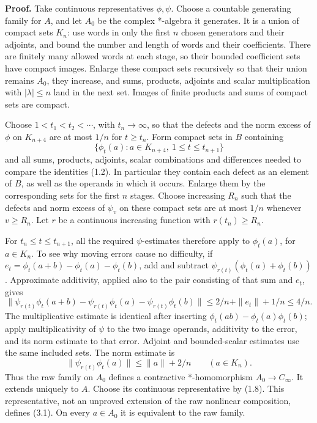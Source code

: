 \documentclass[
  11pt,
]{article}
\begin{document}
\textbf{Proof.} Take continuous representatives \(\phi,\psi\). Choose a
countable generating family for \(A\), and let \(A_0\) be the complex
*-algebra it generates. It is a union of compact sets \(K_n\): use words
in only the first \(n\) chosen generators and their adjoints, and bound
the number and length of words and their coefficients. There are
finitely many allowed words at each stage, so their bounded coefficient
sets have compact images. Enlarge these compact sets recursively so that
their union remains \(A_0\), they increase, and sums, products, adjoints
and scalar multiplication with \(|\lambda|\leq n\) land in the next set.
Images of finite products and sums of compact sets are compact.

Choose \(1<t_1<t_2<\cdots\), with \(t_n\to\infty\), so that the defects
and the norm excess of \(\phi\) on \(K_{n+4}\) are at most \(1/n\) for
\(t\geq t_n\). Form compact sets in \(B\) containing \[
\{\phi_t(a):a\in K_{n+4},\ 1\leq t\leq t_{n+1}\}
\tag{3.2}
\] and all sums, products, adjoints, scalar combinations and differences
needed to compare the identities (1.2). In particular they contain each
defect as an element of \(B\), as well as the operands in which it
occurs. Enlarge them by the corresponding sets for the first \(n\)
stages. Choose increasing \(R_n\) such that the defects and norm excess
of \(\psi_v\) on these compact sets are at most \(1/n\) whenever
\(v\geq R_n\). Let \(r\) be a continuous increasing function with
\(r(t_n)\geq R_n\).

For \(t_n\leq t\leq t_{n+1}\), all the required \(\psi\)-estimates
therefore apply to \(\phi_t(a)\), for \(a\in K_n\). To see why moving
errors cause no difficulty, if \(e_t=\phi_t(a+b)-\phi_t(a)-\phi_t(b)\),
add and subtract \(\psi_{r(t)}(\phi_t(a)+\phi_t(b))\). Approximate
additivity, applied also to the pair consisting of that sum and \(e_t\),
gives \[
\|\psi_{r(t)}\phi_t(a+b)-\psi_{r(t)}\phi_t(a)
-\psi_{r(t)}\phi_t(b)\|
\leq 2/n+\|e_t\|+1/n\leq4/n.
\tag{3.3}
\] The multiplicative estimate is identical after inserting
\(\phi_t(ab)-\phi_t(a)\phi_t(b)\); apply multiplicativity of \(\psi\) to
the two image operands, additivity to the error, and its norm estimate
to that error. Adjoint and bounded-scalar estimates use the same
included sets. The norm estimate is \[
\|\psi_{r(t)}\phi_t(a)\|\leq\|a\|+2/n\qquad(a\in K_n).
\tag{3.4}
\] Thus the raw family on \(A_0\) defines a contractive *-homomorphism
\(A_0\to C_\infty\). It extends uniquely to \(A\). Choose its continuous
representative by (1.8). This representative, not an unproved extension
of the raw nonlinear composition, defines (3.1). On every \(a\in A_0\)
it is equivalent to the raw family.
\end{document}
